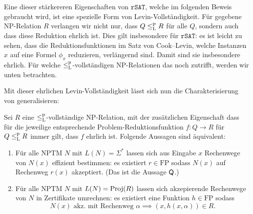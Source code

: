 Eine dieser stärkereren Eigenschaften von $\mathtt{rSAT}$, welche im folgenden Beweis gebraucht wird, ist eine spezielle Form von Levin-Vollständigkeit. Für gegebene NP-Relation $R$ verlangen wir nicht nur, dass $Q\leq_\mathrm{L}^\mathrm{p} R$ für alle $Q$, sondern auch dass diese Reduktion ehrlich ist. Dies gilt insbesondere für $\mathtt{rSAT}$: es ist leicht zu sehen, dass die Reduktionsfunktionen im Satz von Cook--Levin, welche Instanzen $x$ auf eine Formel $\phi_x$ reduzieren, verlängernd sind. Damit sind sie insbesondere ehrlich. Für welche $\leq_\mathrm{L}^\mathrm{p}$-vollständigen NP-Relationen das noch zutrifft, werden wir unten betrachten.

Mit dieser ehrlichen Levin-Vollständigkeit lässt sich nun die Charakterisierung von \citeauthor{fenner_inverting_2003} generalisieren:
\begin{lemma}\label{lemma:q-generalized}
    Sei $R$ eine $\leq_\mathrm{L}^\mathrm{p}$-vollständige NP-Relation, mit der zusätzlichen Eigenschaft dass für die jeweilige entsprechende Problem-Reduktionsfunktion $f\colon Q\to R$ für $Q\leq_\mathrm{L}^\mathrm{p} R$ immer gilt, dass $f$ ehrlich ist.
Folgende Aussagen sind äquivalent:
\begin{enumerate}
    \item Für alle NPTM $N$ mit $L(N)=\Sigma^*$ lassen sich aus Eingabe $x$ Rechenwege von $N(x)$ effizient bestimmen: es existiert $r\in\mathrm{FP}$ sodass $N(x)$ auf Rechenweg $r(x)$ akzeptiert. (Das ist die Aussage $\mathsf{Q}$.)
    \item Für alle NPTM $N$ mit $L(N)=\operatorname{Proj}(R)$ lassen sich akzepierende Rechenwege von $N$ in Zertifikate umrechnen: es existiert eine Funktion $h\in\mathrm{FP}$ sodass
        \[ N(x) \text{ akz. mit Rechenweg $\alpha$} \implies (x,h(x,\alpha))\in R. \]
\end{enumerate}
\end{lemma}
